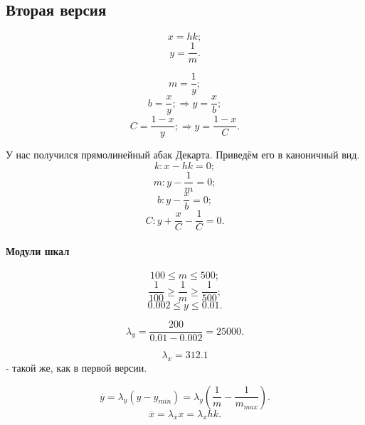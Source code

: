 \subsection{Вторая версия}

$$x = hk;$$
$$y = \frac{1}{m}.$$

$$m = \frac{1}{y};$$
$$b = \frac{x}{y}; \Rightarrow y = \frac{x}{b};$$
$$C = \frac{1 - x}{y}; \Rightarrow y = \frac{1 - x}{C}.$$

У нас получился прямолинейный абак Декарта.
Приведём его в каноничный вид.
$$k: x - hk = 0;$$
$$m: y - \frac{1}{m} = 0;$$
$$b: y - \frac{x}{b} = 0;$$
$$C: y + \frac{x}{C} - \frac{1}{C} =0.$$

\paragraph{Модули шкал}
$$100 \le m \le 500;$$
$$\frac{1}{100} \ge \frac{1}{m} \ge \frac{1}{500};$$
$$0.002 \le y \le 0.01.$$

$$\lambda_y = \frac{200}{0.01 - 0.002} = 25000.$$


$$\lambda_x = 312.1$$
- такой же, как в первой версии.

$$\overline{y} = \lambda_y (y - y_{min}) = \lambda_y 
\left( 
	\frac{1}{m} 
	- \frac{1}{m_{max}} 
\right) 
.$$
$$\overline{x} = \lambda_x x = \lambda_x h k.$$
